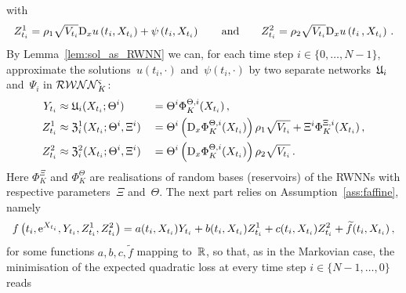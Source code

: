 with
$$
Z^1_{t_i}  = \rho_1 \sqrt{V_{t_{i}}} \mathrm{D}_{x} u\left({t_{i}}, X_{t_{i}}\right) + \psi\left({t_{i}}, X_{t_{i}}\right)
\qquad\text{and}\qquad
Z^2_{t_i}  = \rho_2\sqrt{V_{t_{i}}} \mathrm{D}_{x} u\left({t_{i}}\,, X_{t_{i}}\right)\,.
$$
By Lemma~\ref{lem:sol_as_RWNN} we can, for each time step $i\in\{0, \dots, N-1\}$, approximate the solutions~$u(t_i,\cdot)$ and~$\psi(t_i,\cdot)$ by two separate networks~$\mathfrak{U}_i$ and~$\Psi_i$ in $\mathcal{RWNN}_K^{\varsigma}$: 
\begin{alignat*}{3}
    Y_{t_i} &\approx \mathfrak{U}_i(X_{t_i}; \Theta^i) && = \Theta^i \Phi^{\Theta,i}_K(X_{t_i})\,, \\
    Z^1_{t_i} &\approx \mathfrak{Z}^1_i(X_{t_i}; \Theta^i, \Xi^i) && = \Theta^i \left(\mathrm{D}_{x} \Phi_K^{\Theta,i}(X_{t_i})\right) \rho_1\sqrt{V_{t_i}} + \Xi^i\Phi^{\Xi,i}_K(X_{t_i})\,, \\
    Z^2_{t_i} &\approx \mathfrak{Z}^2_i(X_{t_i}; \Theta^i, \Xi^i) && = \Theta^i \left(\mathrm{D}_{x} \Phi_K^{\Theta,i}(X_{t_i})\right) \rho_2\sqrt{V_{t_i}}\,.
\end{alignat*}
Here $\Phi_K^\Xi$ and $\Phi_K^\Theta$ are realisations of random bases (reservoirs) of the RWNNs with respective parameters~$\Xi$ and~$\Theta$. 
The next part relies on Assumption~\ref{ass:faffine}, namely
$$
f\left(t_i, \mathrm{e}^{X_{t_{i}}},  Y_{t_i},  Z^1_{t_i},  Z^2_{t_i}\right) = a(t_i,X_{t_i}) Y_{t_i} + b(t_i,X_{t_i}) Z^1_{t_i} + c(t_i,X_{t_i}) Z^2_{t_i} + \widetilde{f}(t_i,X_{t_i})\,,
$$
for some functions $a,b,c,\widetilde{f}$ mapping to~$\mathbb{R}$, so that, as in the Markovian case, the minimisation of the expected quadratic loss at every time step $i\in\{N-1,\dots,0\}$ reads
\begingroup
\allowdisplaybreaks
